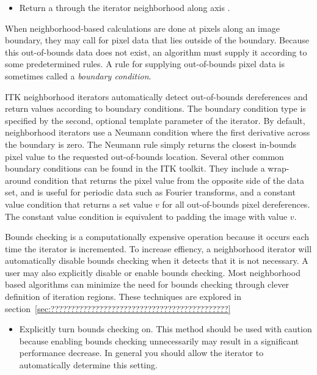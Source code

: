 {\begin{itemize}
\item \textbf{} Return a
 through the iterator neighborhood along axis .

\end{itemize}

When neighborhood-based calculations are done at pixels along an image
boundary, they may call for pixel data that lies outside of the boundary.
Because this out-of-bounds data does not exist, an algorithm must supply it
according to some predetermined rules.  A rule for supplying out-of-bounds
pixel data is sometimes called a \emph{boundary condition}.
 
ITK neighborhood iterators automatically detect out-of-bounds dereferences and
return values according to boundary conditions.  The boundary condition type is
specified by the second, optional template parameter of the iterator.  By
default, neighborhood iterators use a Neumann condition where the first
derivative across the boundary is zero.  The Neumann rule simply returns the
closest in-bounds pixel value to the requested out-of-bounds location.  Several
other common boundary conditions can be found in the ITK toolkit.  They include
a wrap-around condition that returns the pixel value from the opposite side of
the data set, and is useful for periodic data such as Fourier transforms, and a
constant value condition that returns a set value $v$ for all out-of-bounds pixel
dereferences.  The constant value condition is equivalent to padding the image
with value $v$.

Bounds checking is a computationally expensive operation because it occurs each
time the iterator is incremented.  To increase effiency, a neighborhood
iterator will automatically disable bounds checking when it detects that it is
not necessary.  A user may also explicitly disable or enable bounds checking.
Most neighborhood based algorithms can minimize the need for bounds checking
through clever definition of iteration regions.  These techniques are explored
in section~\ref{sec:????????????????????????????????????????????}

\begin{itemize}
\item \textbf{} Explicitly turn
bounds checking on.  This method should be used with caution because
enabling bounds checking unnecessarily may result in a significant performance
decrease. In general you should allow the iterator to automatically determine
this setting.


\end{itemize}}

